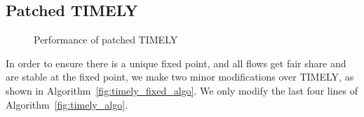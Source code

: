 \subsection {Patched TIMELY}
\label{sec:timely_fixed}

\begin{figure}[t]
\center
{}
\vspace{-0.5em}
\caption{Performance of patched TIMELY}
\vspace{-0.5em}
\label{fig:timely_fixed}
\end{figure}

In order to ensure there is a unique fixed point, and all flows get fair
share and are stable at the fixed point, we make two minor modifications over
TIMELY, as shown in Algorithm~\ref{fig:timely_fixed_algo}. We only modify the
last four lines of Algorithm~\ref{fig:timely_algo}.

